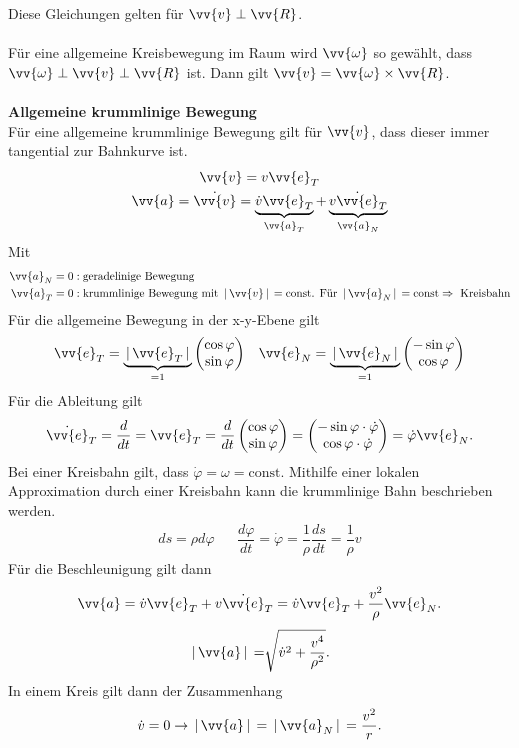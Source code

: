 \documentclass[a4paper,12pt]{article}
\numberwithin{equation}{section}
\begin{document}
Diese Gleichungen gelten für $\vv{v}\perp \vv{R}$.\\\\
Für eine allgemeine Kreisbewegung im Raum wird $\vv{\omega }$ so gewählt, dass $\vv{\omega } \perp \vv{v} \perp \vv{R}$ ist. Dann gilt $\vv{v}=\vv{\omega }\times \vv{R}$.
\\\hfill\\\textbf{Allgemeine krummlinige Bewegung}\\
Für eine allgemeine krummlinige Bewegung gilt für $\vv{v}$, dass dieser immer tangential zur Bahnkurve ist. 
\begin{gather*}
        \vv{v}=v \vv{e}_T\\
        \vv{a}=\dot{\vv{v}}=\underbrace{\dot{v}\vv{e}_T}_{\vv{a}_T}+\underbrace{v \dot{\vv{e}}_T}_{\vv{a}_N}
\end{gather*}
Mit 
\begin{align*}
        \vv{a}_N=0&:\text{geradelinige Bewegung}\\
        \vv{a}_T=0&:\text{krummlinige Bewegung mit }\,|\, \vv{v}\,|\, =\text{const}\text{. Für }\,|\, \vv{a}_N\,|\, =\text{const}\Rightarrow \text{ Kreisbahn}
\end{align*}
Für die allgemeine Bewegung in der x-y-Ebene gilt
\begin{align*}
        \vv{e}_T=\underbrace{\,|\, \vv{e}_T\,|\,}_{=1} \left(\begin{matrix}
                \cos \varphi \\
                \sin \varphi 
        \end{matrix}\right)&&\vv{e}_N=\underbrace{\,|\, \vv{e}_N\,|\,}_{=1} \left(\begin{matrix}
                -\sin \varphi \\
                \cos \varphi 
        \end{matrix}\right)
\end{align*}
Für die Ableitung gilt
\[ 
        \dot{\vv{e}}_T=\dfrac{d}{dt}=\vv{e}_T=\dfrac{d}{dt}\left(\begin{matrix}
                \cos \varphi \\
                \sin \varphi 
        \end{matrix}\right)=\left(\begin{matrix}
                -\sin \varphi \cdot \dot{\varphi }\\
                \cos \varphi \cdot \dot{\varphi }
        \end{matrix}\right)=\dot{\varphi }\vv{e}_N
.\] 
Bei einer Kreisbahn gilt, dass $\dot{\varphi }=\omega =\text{const}$. Mithilfe einer lokalen Approximation durch einer Kreisbahn kann die krummlinige Bahn beschrieben werden.
\begin{align*}
        ds=\rho d\varphi &&\dfrac{d\varphi }{dt}=\dot{\varphi} =\dfrac{1}{\rho }\dfrac{ds}{dt}=\dfrac{1}{\rho }v
\end{align*}
Für die Beschleunigung gilt dann
\[ 
        \vv{a}=\dot{v}\vv{e}_T+v\dot{\vv{e}}_T=\dot{v}\vv{e}_T+\dfrac{v^2}{\rho }\vv{e}_N
.\] 
\[
        \,|\, \vv{a}\,|\, =\sqrt[]{\dot{v}^2+\dfrac{v^{4}}{\rho ^{2} }}
.\]
In einem Kreis gilt dann der Zusammenhang
\[ 
        \dot{v}=0\rightarrow \,|\, \vv{a}\,|\, =\,|\, \vv{a}_N\,|\, =\dfrac{v^2}{r}
.\] 
\end{document}
